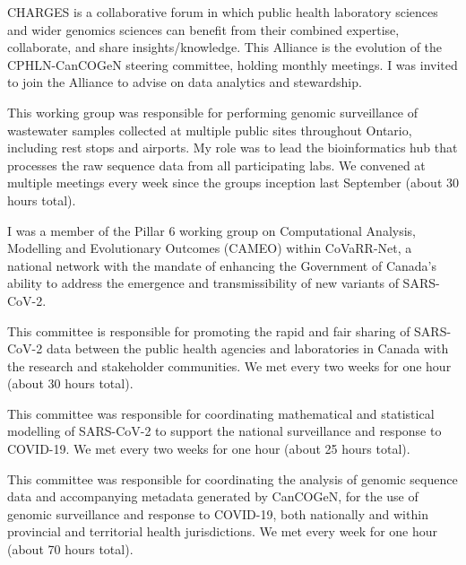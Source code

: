 {}{}
{CHARGES is a collaborative forum in which public health laboratory sciences and wider genomics sciences can benefit from their combined expertise, collaborate, and share insights/knowledge. This Alliance is the evolution of the CPHLN-CanCOGeN steering committee, holding monthly meetings.  I was invited to join the Alliance to advise on data analytics and stewardship.}

{}{}
{This working group was responsible for performing genomic surveillance of wastewater samples collected at multiple public sites throughout Ontario, including rest stops and airports.  
My role was to lead the bioinformatics hub that processes the raw sequence data from all participating labs.  
We convened at multiple meetings every week since the groups inception last September (about 30 hours total).}


{}{}
{I was a member of the Pillar 6 working group on Computational Analysis, Modelling and Evolutionary Outcomes (CAMEO) within CoVaRR-Net, a national network with the mandate of enhancing the Government of Canada's ability to address the emergence and transmissibility of new variants of SARS-CoV-2.}

{}{}{This committee is responsible for promoting the rapid and fair sharing of SARS-CoV-2 data between the public health agencies and laboratories in Canada with the research and stakeholder communities.  We met every two weeks for one hour (about 30 hours total).}

{}{}{This committee was responsible for coordinating mathematical and statistical modelling of SARS-CoV-2 to support the national surveillance and response to COVID-19.  We met every two weeks for one hour (about 25 hours total).}

{}{}{This committee was responsible for coordinating the analysis of genomic sequence data and accompanying metadata generated by CanCOGeN, for the use of genomic surveillance and response to COVID-19, both nationally and within provincial and territorial health jurisdictions.  We met every week for one hour (about 70 hours total).}

